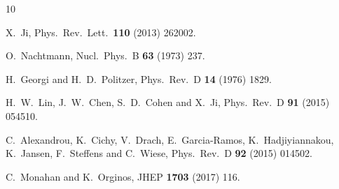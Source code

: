 \documentclass[final,5p,times,twocolumn]{elsarticle}
\begin{document}
\begin{thebibliography}{10}

  X.~Ji,
  Phys.\ Rev.\ Lett.\  {\bf 110} (2013) 262002.


  O.~Nachtmann,
  Nucl.\ Phys.\ B {\bf 63} (1973) 237.



  H.~Georgi and H.~D.~Politzer,
  Phys.\ Rev.\ D {\bf 14} (1976) 1829.



  H.~W.~Lin, J.~W.~Chen, S.~D.~Cohen and X.~Ji,
  Phys.\ Rev.\ D {\bf 91} (2015) 054510.



  C.~Alexandrou, K.~Cichy, V.~Drach, E.~Garcia-Ramos, K.~Hadjiyiannakou, K.~Jansen, F.~Steffens and C.~Wiese,
  Phys.\ Rev.\ D {\bf 92} (2015) 014502. 





  C.~Monahan and K.~Orginos,
  JHEP {\bf 1703} (2017) 116.


\end{thebibliography}
\end{document}

